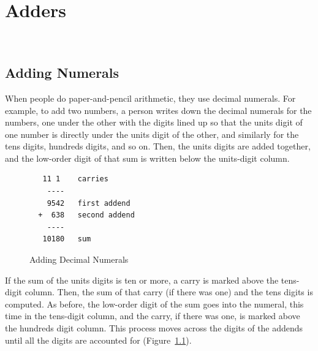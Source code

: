 \chapter{Adders}
\label{ch:adders}\


\section{Adding Numerals}
\label{sec:addition-by-numeral}

When people do paper-and-pencil 
arithmetic,
they use decimal numerals.
For example, to add two numbers, a person
writes down the decimal numerals for the numbers,
one under the other with the digits lined up so that
the units digit of one number is directly under
the units digit of the other, and similarly for
the tens digits, hundreds digits, and so on.
Then, the units digits are added together,
and the low-order digit of that sum is written
below the units-digit column.

\begin{figure}
\begin{center}
\begin{minipage}[b]{0.4\textwidth}
\begin{verbatim}
   11 1    carries
    ----
    9542   first addend
  +  638   second addend
    ----
   10180   sum
\end{verbatim}
\end{minipage}
\end{center}
\caption{Adding Decimal Numerals}
\label{fig:adding-decimal-numerals}
\end{figure}

If the sum of the units digits is ten or more, a
carry 
is marked above the tens-digit column.
Then, the sum of that carry (if there was one) and 
the tens digits is computed.
As before, the low-order digit of the sum 
goes into the numeral, this time in the
tens-digit column, and the carry,
if there was one, is marked
above the hundreds digit column.
This process moves across the digits of the addends until all the digits
are accounted for (Figure~\ref{fig:adding-decimal-numerals}).

